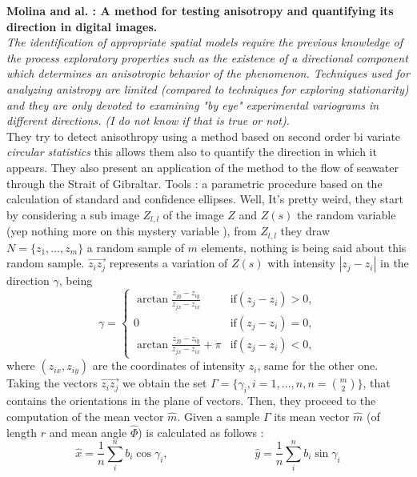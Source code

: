\documentclass[12pt]{article}
\renewcommand{\hat}{\widehat}
\theoremstyle{Theorem}
\theoremstyle{definition}
\begin{document}
{\textbf{Molina and al. : A method for testing anisotropy and quantifying its direction in digital images.}\\
 \textit{The identification of appropriate spatial models require the previous knowledge of the process exploratory properties such as the existence of a directional component which determines an anisotropic behavior of the phenomenon. Techniques used for analyzing anistropy are limited (compared to techniques for exploring stationarity) and they are only devoted to examining "by eye" experimental variograms in
different directions. (I do not know if that is true or not).} \\
They try to detect anisothropy using a method based on second order bi variate \textit{circular statistics} this allows them also to quantify the direction in which it appears. They also present an application of the method to  the flow of seawater through the Strait of Gibraltar. Tools : a parametric procedure based on the calculation of standard and confidence ellipses. Well, It's pretty weird, they start by considering a sub image $Z_{l,l}$ of the image $Z$ and $Z(s)$ the random variable (yep nothing more on this mystery variable ), from $Z_{l,l}$ they draw $N=\{z_{1}, \ldots, z_{m}\}$ a random sample of $m$ elements, nothing is being said about this random sample. $\overrightarrow{z_{i}z_{j}}$ represents a variation of $Z(s)$ with intensity $|z_{j} - z_{i}|$ in the direction $\gamma$, being 
\begin{equation*}
\gamma = \begin{cases} \arctan{\frac{z_{jy} - z_{iy}}{z_{jx} - z_{ix}}}& \text{if} (z_{j} - z_{i}) > 0, \\
0 & \text{if} (z_{j} - z_{i}) = 0, \\
 \arctan{\frac{z_{jy} - z_{iy}}{z_{jx} - z_{ix}}} + \pi & \text{if} (z_{j} - z_{i})  < 0, 
\end{cases}
\end{equation*}
where $(z_{ix}, z_{iy})$ are the coordinates of intensity $z_i$, same for the other one. Taking the vectors $\overrightarrow{z_{i}z_{j}}$ we obtain the set $\Gamma = \{\gamma_{i}, i = 1, \ldots, n, n = \binom{m}{2}\}$, that contains the orientations in the plane of vectors. Then, they proceed to the computation of the mean vector $\hat{m}$. Given a sample $\Gamma$ its mean vector $\hat{m}$ (of length $r$ and mean angle $\hat{\Phi}$) is calculated as follows : 
\begin{equation*}
\hat{x} = \frac{1}{n} \sum_{i}^{n} b_{i}\cos{\gamma_{i}}, \; \hspace{3cm}  \; \hat{y} = \frac{1}{n}\sum_{i}^{n}b_{i}\sin{\gamma_{i}}

\end{equation*}}
\end{document}
